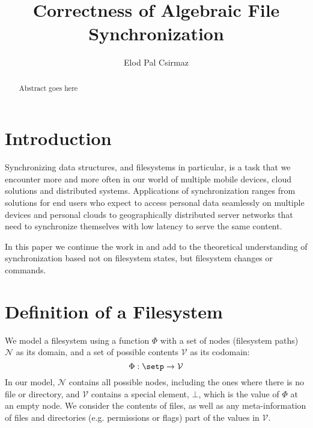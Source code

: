 \documentclass[12pt]{article}
\title{Correctness of Algebraic File Synchronization}
\author{Elod Pal Csirmaz}
\newcommand{\setv}{\mathcal{V}} %
\newcommand{\setn}{\mathcal{N}} %
\newcommand{\empt}{\bot}
\newcommand{\FS}{\Phi} %
\theoremstyle{definition}
\begin{document}
\maketitle
\begin{abstract}
Abstract goes here
\end{abstract}

\section{Introduction}

Synchronizing data structures, and filesystems in particular,
is a task that we encounter more and more often in our world
of multiple mobile devices, cloud solutions and distributed systems.
Applications of synchronization ranges from
solutions for end users who expect to access personal data seamlessly
on multiple devices and personal clouds to geographically distributed server networks
that need to synchronize themselves with low latency to serve the 
same content.

In this paper we
continue the work in \cite{NREC:alg} and add to the theoretical understanding
of synchronization based not on filesystem states, but filesystem changes or commands.





\section{Definition of a Filesystem}

We model a filesystem using a function $\FS$ with a set of nodes (filesystem paths) $\setn$ as its domain,
and a set of possible contents $\setv$ as its codomain:
\[ \FS : \setp \rightarrow \setv \] 
In our model, $\setn$ contains all possible nodes, including the ones where there is no file or directory,
and $\setv$ contains a special element, $\empt$, which is the value of $\FS$ at an empty node.
We consider the contents of files, as well as any meta-information of files
and directories (e.g. permissions or flags) part of the values in $\setv$.
\end{document}
